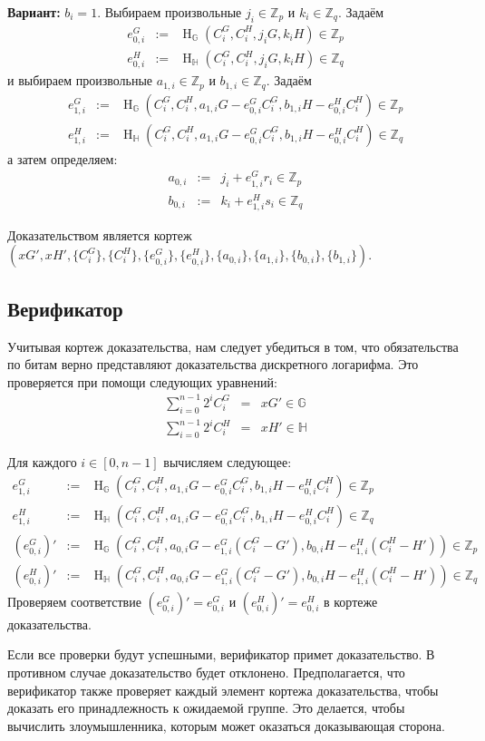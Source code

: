 \documentclass{mrl}
\newcommand{\hg}{\operatorname{H}_\mathbb{G}}
\newcommand{\hh}{\operatorname{H}_\mathbb{H}}
\newcommand{\zp}{\mathbb{Z}_p}
\newcommand{\zq}{\mathbb{Z}_q}
\begin{document}
\textbf{Вариант:} $b_i = 1$. Выбираем произвольные $j_i \in \zp$ и $k_i \in \zq$. Задаём
\begin{eqnarray*}
e_{0,i}^G &:=& \hg\left( C_i^G, C_i^H, j_iG, k_iH \right) \in \zp \\
e_{0,i}^H &:=& \hh\left( C_i^G, C_i^H, j_iG, k_iH \right) \in \zq
\end{eqnarray*}
и выбираем произвольные $a_{1,i} \in \zp$ и $b_{1,i} \in \zq$. Задаём
\begin{eqnarray*}
e_{1,i}^G &:=& \hg\left( C_i^G, C_i^H, a_{1,i}G - e_{0,i}^GC_i^G, b_{1,i}H - e_{0,i}^HC_i^H \right) \in \zp \\
e_{1,i}^H &:=& \hh\left( C_i^G, C_i^H, a_{1,i}G - e_{0,i}^GC_i^G, b_{1,i}H - e_{0,i}^HC_i^H \right) \in \zq
\end{eqnarray*}
а затем определяем:
\begin{eqnarray*}
a_{0,i} &:=& j_i + e_{1,i}^Gr_i \in \zp \\
b_{0,i} &:=& k_i + e_{1,i}^Hs_i \in \zq
\end{eqnarray*}

Доказательством является кортеж $\left( xG',xH',\{C_i^G\},\{C_i^H\}, \{e_{0,i}^G\}, \{e_{0,i}^H\}, \{a_{0,i}\}, \{a_{1,i}\}, \{b_{0,i}\}, \{b_{1,i}\} \right)$.

\subsection{Верификатор}
Учитывая кортеж доказательства, нам следует убедиться в том, что обязательства по битам верно представляют доказательства дискретного логарифма. Это проверяется при помощи следующих уравнений:
\begin{eqnarray*}
\sum_{i=0}^{n-1} 2^iC_i^G &=& xG' \in \mathbb{G} \\
\sum_{i=0}^{n-1} 2^iC_i^H &=& xH' \in \mathbb{H}
\end{eqnarray*}

Для каждого $i \in [0,n-1]$ вычисляем следующее:
\begin{eqnarray*}
e_{1,i}^G &:=& \hg\left( C_i^G, C_i^H, a_{1,i}G - e_{0,i}^GC_i^G, b_{1,i}H - e_{0,i}^HC_i^H \right) \in \zp \\
e_{1,i}^H &:=& \hh\left( C_i^G, C_i^H, a_{1,i}G - e_{0,i}^GC_i^G, b_{1,i}H - e_{0,i}^HC_i^H \right) \in \zq \\
(e_{0,i}^G)' &:=& \hg\left( C_i^G, C_i^H, a_{0,i}G - e_{1,i}^G(C_i^G-G'), b_{0,i}H - e_{1,i}^H(C_i^H-H') \right) \in \zp \\
(e_{0,i}^H)' &:=& \hh\left( C_i^G, C_i^H, a_{0,i}G - e_{1,i}^G(C_i^G-G'), b_{0,i}H - e_{1,i}^H(C_i^H-H') \right) \in \zq
\end{eqnarray*}
Проверяем соответствие $(e_{0,i}^G)' = e_{0,i}^G$ и $(e_{0,i}^H)' = e_{0,i}^H$ в кортеже доказательства.

Если все проверки будут успешными, верификатор примет доказательство. В противном случае доказательство будет отклонено. Предполагается, что верификатор также проверяет каждый элемент кортежа доказательства, чтобы доказать его принадлежность к ожидаемой группе. Это делается, чтобы вычислить злоумышленника, которым может оказаться доказывающая сторона.
\end{document}
